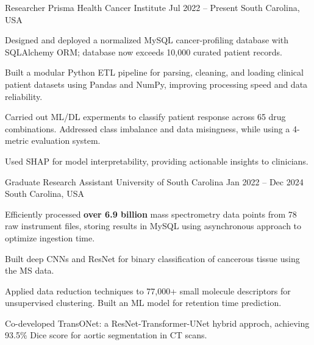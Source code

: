 
\vspace*{-0.2cm}

\begin{cventries}
\cventry
        {Researcher} 
        {Prisma Health Cancer Institute} 
        {Jul 2022 -- Present} 
        {South Carolina, USA} 
        {
            \begin{cvitemsfree}
                \item{Designed and deployed a normalized MySQL cancer-profiling database with SQLAlchemy ORM; database now exceeds 10,000 curated patient records.}
                \item{Built a modular Python ETL pipeline for parsing, cleaning, and loading clinical patient datasets using Pandas and NumPy, improving processing speed and data reliability.}
                \item{Carried out ML/DL experments to classify patient response across 65 drug combinations. Addressed class imbalance and data misingness, while using a 4-metric evaluation system.}
                \item{Used SHAP for model interpretability, providing actionable insights to clinicians.}
            \end{cvitemsfree}
        }

    \cventry
        {Graduate Research Assistant} 
        {University of South Carolina} 
        {Jan 2022 -- Dec 2024} 
        {South Carolina, USA} 
        {
            \begin{cvitemsfree}
                \item{Efficiently processed \textbf{over 6.9 billion} mass spectrometry data points from 78 raw instrument files, storing results in MySQL using asynchronous approach to optimize ingestion time.}
                \item{Built deep CNNs and ResNet for binary classification of cancerous tissue using the MS data.}
                \item{Applied data reduction techniques to 77,000+ small molecule descriptors for unsupervised clustering. Built an ML model for retention time prediction.}  %
                \item{Co-developed TransONet: a ResNet-Transformer-UNet hybrid approch, achieving 93.5\% Dice score for aortic segmentation in CT scans.}
            \end{cvitemsfree}
        }


\end{cventries}
